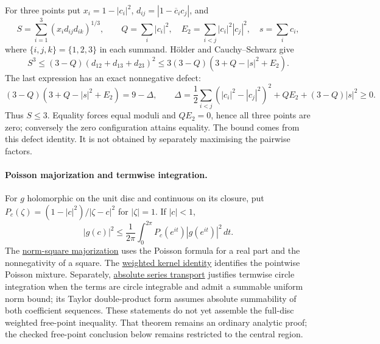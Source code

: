 \documentclass[11pt]{article}
\begin{document}
For three points put $x_i=1-|c_i|^2$,
$d_{ij}=|1-\overline c_ic_j|$, and
\[
 S=\sum_{i=1}^3(x_i d_{ij}d_{ik})^{1/3},\qquad
 Q=\sum_i|c_i|^2,\quad E_2=\sum_{i<j}|c_i|^2|c_j|^2,
 \quad s=\sum_i c_i,
\]
where $\{i,j,k\}=\{1,2,3\}$ in each summand.  Hölder and
Cauchy--Schwarz give
\[
 S^3\le(3-Q)(d_{12}+d_{13}+d_{23})^2
 \le3(3-Q)(3+Q-|s|^2+E_2).
\]
The last expression has an exact nonnegative defect:
\[
 (3-Q)(3+Q-|s|^2+E_2)=9-\Delta,
 \qquad
 \Delta=\frac12\sum_{i<j}(|c_i|^2-|c_j|^2)^2
          +QE_2+(3-Q)|s|^2\ge0.
\]
Thus $S\le3$.  Equality forces equal moduli and $QE_2=0$, hence all
three points are zero; conversely the zero configuration attains equality.
The bound comes from this defect identity.  It is not obtained by separately
maximising the pairwise factors.

\paragraph{Poisson majorization and termwise integration.}
For $g$ holomorphic on the unit disc and continuous on its closure, put
$P_c(\zeta)=(1-|c|^2)/|\zeta-c|^2$ for $|\zeta|=1$.  If $|c|<1$,
\[
 |g(c)|^2\le\frac1{2\pi}\int_0^{2\pi}
 P_c(e^{it})|g(e^{it})|^2\,dt.
\]
The \href{https://github.com/wcook04/plectis-erdos/blob/d4fed71423840f70f10edf27b9ad27c22fc4f49a/ErdosProblems/Erdos1041/PoissonNormSquare.lean#L114}{norm-square majorization}
uses the Poisson formula for a real part and the nonnegativity of a square.
The \href{https://github.com/wcook04/plectis-erdos/blob/d4fed71423840f70f10edf27b9ad27c22fc4f49a/ErdosProblems/Erdos1041/PoissonKernelBridge.lean#L27}{weighted kernel identity}
identifies the pointwise Poisson mixture.  Separately,
\href{https://github.com/wcook04/plectis-erdos/blob/d4fed71423840f70f10edf27b9ad27c22fc4f49a/ErdosProblems/Erdos1041/CircleSeriesTransport.lean#L49}{absolute series transport}
justifies termwise circle integration when the terms are circle integrable
and admit a summable uniform norm bound; its Taylor double-product form
assumes absolute summability of both coefficient sequences.
These statements do not yet assemble the full-disc weighted free-point
inequality.  That theorem remains an ordinary analytic proof; the checked
free-point conclusion below remains restricted to the central region.
\end{document}
